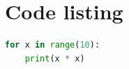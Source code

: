 \documentclass[11pt]{article}
\begin{document}
\section{Code listing}\begin{lstlisting}[language=Python]
for x in range(10):
    print(x * x)
\end{lstlisting}
\end{document}
